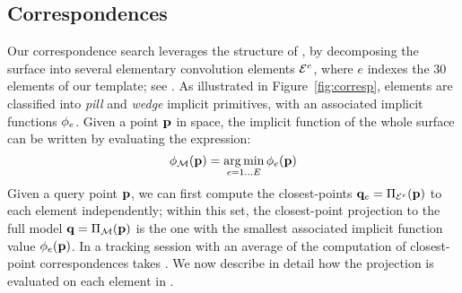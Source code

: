 \label{sec:model} %

\subsection{Correspondences}
\label{sec:corresp}
Our correspondence search leverages the structure of , by decomposing the surface into several elementary convolution elements $\mathcal{E}^e$, where $e$ indexes the 30 elements of our template; see . As illustrated in Figure~\ref{fig:corresp}, elements are classified into 
\emph{pill} and \emph{wedge} implicit primitives, with an associated implicit functions $\phi_e$.
Given a point $\mathbf{p}$ in space, the implicit function of the whole surface can be written by evaluating the expression:
\begin{equation}
\phi_{\mathcal{M}}(\mathbf{p}) = \operatorname*{arg\,min}_{e=1 \dots E} \phi_e(\mathbf{p})
\label{eq:piecewise}
\end{equation}
%
Given a query point $\mathbf{p}$, we can first compute the closest-points $\mathbf{q}_e = \Pi_{\mathcal{E}^e}(\mathbf{p})$ to each element independently; within this set, the closest-point projection to the full model $\mathbf{q} = \Pi_{\mathcal{M}}(\mathbf{p})$ is the one with the smallest associated implicit function value $\phi_e(\mathbf{p})$. In a tracking session with an average of  the computation of closest-point correspondences takes . 
%
We now describe in detail how the projection is evaluated on each element in . 


